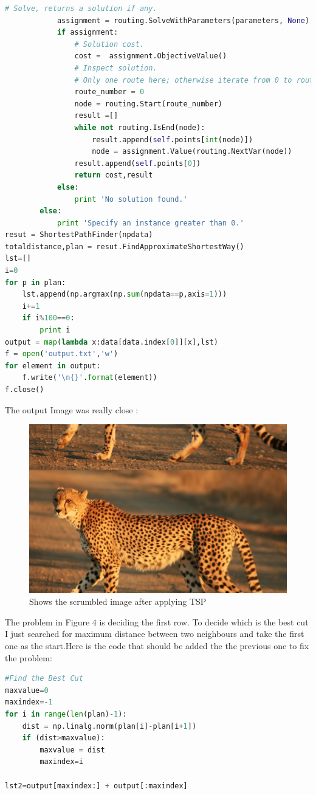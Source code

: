 \documentclass{article}
\begin{document}
\begin{lstlisting}[language=Python]
            # Solve, returns a solution if any.
            assignment = routing.SolveWithParameters(parameters, None)
            if assignment:
                # Solution cost.
                cost =  assignment.ObjectiveValue()
                # Inspect solution.
                # Only one route here; otherwise iterate from 0 to routing.vehicles() - 1
                route_number = 0
                node = routing.Start(route_number)
                result =[]
                while not routing.IsEnd(node):
                    result.append(self.points[int(node)])
                    node = assignment.Value(routing.NextVar(node))
                result.append(self.points[0])
                return cost,result
            else:
                print 'No solution found.'
        else:
            print 'Specify an instance greater than 0.'
resut = ShortestPathFinder(npdata)
totaldistance,plan = resut.FindApproximateShortestWay()
lst=[]
i=0
for p in plan:
    lst.append(np.argmax(np.sum(npdata==p,axis=1)))
    i+=1
    if i%100==0:
        print i
output = map(lambda x:data[data.index[0]][x],lst)
f = open('output.txt','w')
for element in output:
    f.write('\n{}'.format(element))
f.close()
\end{lstlisting}
The output Image was really close :
\begin{figure}[H]
\includegraphics[scale=0.3]{TSP_OUTPUT.png}
\caption{Shows the scrumbled image after applying TSP}
\end{figure}
The problem in Figure 4 is deciding the first row. To decide which is the best cut I just searched for maximum distance between two neighbours and take the first one as the start.Here is the code that should be added the the previous one to fix the problem:
\begin{lstlisting}[language=Python]
#Find the Best Cut
maxvalue=0
maxindex=-1
for i in range(len(plan)-1):
    dist = np.linalg.norm(plan[i]-plan[i+1])
    if (dist>maxvalue):
        maxvalue = dist
        maxindex=i

lst2=output[maxindex:] + output[:maxindex]
\end{lstlisting}
\end{document}
